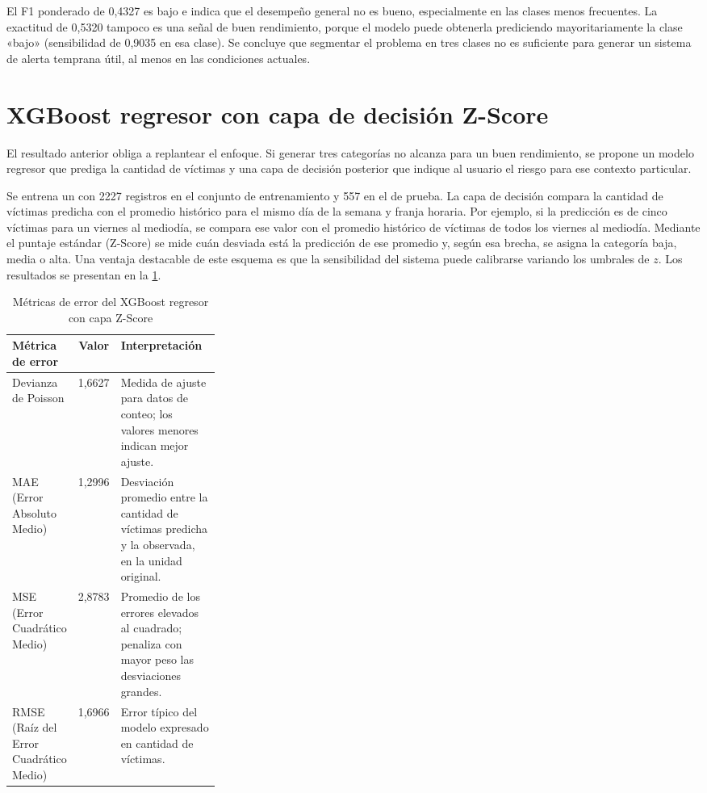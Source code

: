 El F1 ponderado de 0,4327 es bajo e indica que el desempeño general no es bueno, especialmente en las clases menos frecuentes. La exactitud de 0,5320 tampoco es una señal de buen rendimiento, porque el modelo puede obtenerla prediciendo mayoritariamente la clase «bajo» (sensibilidad de 0,9035 en esa clase). Se concluye que segmentar el problema en tres clases no es suficiente para generar un sistema de alerta temprana útil, al menos en las condiciones actuales.

\section{XGBoost regresor con capa de decisión Z-Score}\label{xgboost-regresor-muxe1s-capa-de-decisiuxf3n-z-score}

El resultado anterior obliga a replantear el enfoque. Si generar tres categorías no alcanza para un buen rendimiento, se propone un modelo regresor que prediga la cantidad de víctimas y una capa de decisión posterior que indique al usuario el riesgo para ese contexto particular.

Se entrena un \xgboost{} con 2227 registros en el conjunto de entrenamiento y 557 en el de prueba. La capa de decisión compara la cantidad de víctimas predicha con el promedio histórico para el mismo día de la semana y franja horaria. Por ejemplo, si la predicción es de cinco víctimas para un viernes al mediodía, se compara ese valor con el promedio histórico de víctimas de todos los viernes al mediodía. Mediante el puntaje estándar (Z-Score) se mide cuán desviada está la predicción de ese promedio y, según esa brecha, se asigna la categoría baja, media o alta. Una ventaja destacable de este esquema es que la sensibilidad del sistema puede calibrarse variando los umbrales de $z$. Los resultados se presentan en la \cref{tab:metricas-error-xgb-zscore}.

\begin{table}[htbp]
\centering
\caption{Métricas de error del XGBoost regresor con capa Z-Score}
\label{tab:metricas-error-xgb-zscore}
\begin{tabularx}{\linewidth}{@{}>{\raggedright\arraybackslash}p{0.30\linewidth}c>{\raggedright\arraybackslash}X@{}}
\toprule
\textbf{Métrica de error} & \textbf{Valor} & \textbf{Interpretación} \\
\midrule
Devianza de Poisson & 1,6627 & Medida de ajuste para datos de conteo; los valores menores indican mejor ajuste. \\
MAE (Error Absoluto Medio) & 1,2996 & Desviación promedio entre la cantidad de víctimas predicha y la observada, en la unidad original. \\
MSE (Error Cuadrático Medio) & 2,8783 & Promedio de los errores elevados al cuadrado; penaliza con mayor peso las desviaciones grandes. \\
RMSE (Raíz del Error Cuadrático Medio) & 1,6966 & Error típico del modelo expresado en cantidad de víctimas. \\
\bottomrule
\end{tabularx}
\end{table}

